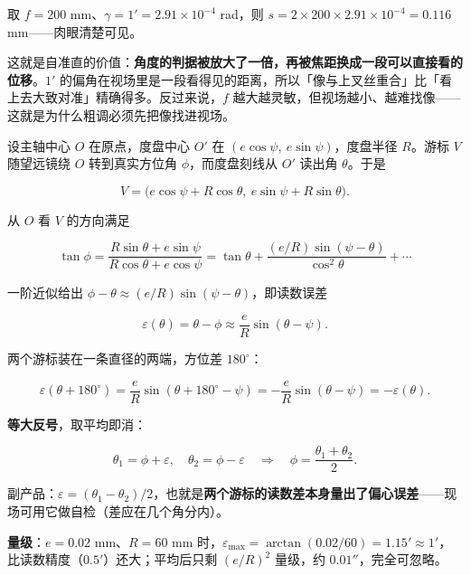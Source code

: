 取 $f=200$ mm、$\gamma=1'=2.91\times10^{-4}$ rad，则 $s=2\times200\times2.91\times10^{-4}=0.116$ mm——肉眼清楚可见。

这就是自准直的价值：\textbf{角度的判据被放大了一倍，再被焦距换成一段可以直接看的位移}。$1'$ 的偏角在视场里是一段看得见的距离，所以「像与上叉丝重合」比「看上去大致对准」精确得多。反过来说，$f$ 越大越灵敏，但视场越小、越难找像——这就是为什么粗调必须先把像找进视场。


设主轴中心 $O$ 在原点，度盘中心 $O'$ 在 $(e\cos\psi,\ e\sin\psi)$，度盘半径 $R$。游标 $V$ 随望远镜绕 $O$ 转到真实方位角 $\phi$，而度盘刻线从 $O'$ 读出角 $\theta$。于是

\[
V=\bigl(e\cos\psi+R\cos\theta,\ e\sin\psi+R\sin\theta\bigr).
\]

从 $O$ 看 $V$ 的方向满足

\[
\tan\phi=\frac{R\sin\theta+e\sin\psi}{R\cos\theta+e\cos\psi}
=\tan\theta+\frac{(e/R)\sin(\psi-\theta)}{\cos^2\theta}+\cdots
\]

一阶近似给出 $\phi-\theta\approx(e/R)\sin(\psi-\theta)$，即读数误差

\[
\varepsilon(\theta)=\theta-\phi\approx\frac{e}{R}\sin(\theta-\psi).
\]

两个游标装在一条直径的两端，方位差 $180^{\circ}$：

\[
\varepsilon(\theta+180^{\circ})=\frac{e}{R}\sin(\theta+180^{\circ}-\psi)=-\frac{e}{R}\sin(\theta-\psi)=-\varepsilon(\theta).
\]

\textbf{等大反号}，取平均即消：

\[
\theta_1=\phi+\varepsilon,\quad\theta_2=\phi-\varepsilon
\quad\Longrightarrow\quad
\phi=\frac{\theta_1+\theta_2}{2}.
\]

副产品：$\varepsilon=(\theta_1-\theta_2)/2$，也就是\textbf{两个游标的读数差本身量出了偏心误差}——现场可用它做自检（差应在几个角分内）。

\textbf{量级}：$e=0.02$ mm、$R=60$ mm 时，$\varepsilon_{\max}=\arctan(0.02/60)=1.15'\approx1'$，比读数精度（$0.5'$）还大；平均后只剩 $(e/R)^2$ 量级，约 $0.01''$，完全可忽略。

